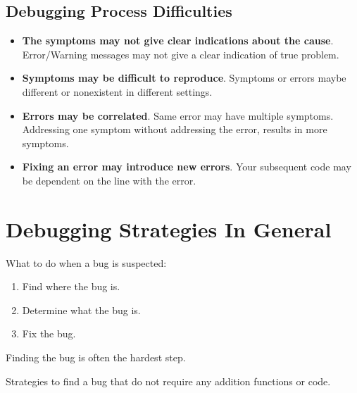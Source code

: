 \documentclass[
]{book}
\providecommand{\tightlist}{%
  \setlength{\itemsep}{0pt}\setlength{\parskip}{0pt}}
\begin{document}
\hypertarget{debugging-process-difficulties}{%
\subsection*{Debugging Process Difficulties}\label{debugging-process-difficulties}}

\begin{itemize}
\item
  \textbf{The symptoms may not give clear indications about the cause}. Error/Warning messages may not give a clear indication of true problem.
\item
  \textbf{Symptoms may be difficult to reproduce}. Symptoms or errors maybe different or nonexistent in different settings.
\item
  \textbf{Errors may be correlated}. Same error may have multiple symptoms. Addressing one symptom without addressing the error, results in more symptoms.
\item
  \textbf{Fixing an error may introduce new errors}. Your subsequent code may be dependent on the line with the error.
\end{itemize}

\hypertarget{debugging-strategies-in-general}{%
\section{Debugging Strategies In General}\label{debugging-strategies-in-general}}

What to do when a bug is suspected:

\begin{enumerate}
\def\labelenumi{\arabic{enumi})}
\tightlist
\item
  Find where the bug is.
\item
  Determine what the bug is.
\item
  Fix the bug.
\end{enumerate}

Finding the bug is often the hardest step.

Strategies to find a bug that do not require any addition functions or code.
\end{document}
